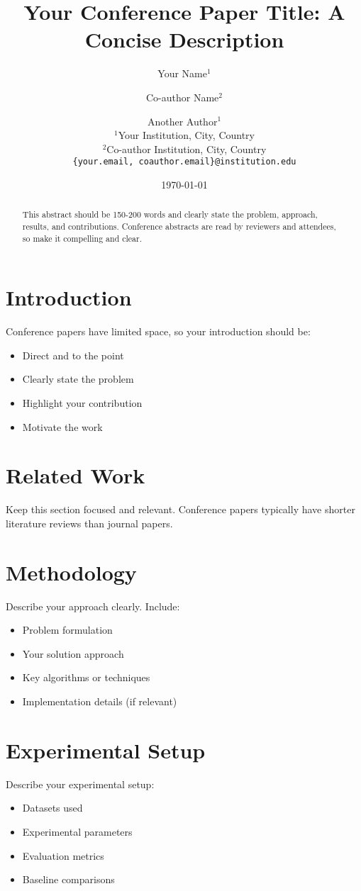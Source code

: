 \documentclass[10pt,twocolumn]{article}
\title{Your Conference Paper Title: A Concise Description}
\author{
    Your Name$^1$ \and 
    Co-author Name$^2$ \and 
    Another Author$^1$ \\
    $^1$Your Institution, City, Country \\
    $^2$Co-author Institution, City, Country \\
    \texttt{\{your.email, coauthor.email\}@institution.edu}
}
\date{\today}
\begin{document}
\maketitle

\begin{abstract}
This abstract should be 150-200 words and clearly state the problem, approach, results, and contributions. Conference abstracts are read by reviewers and attendees, so make it compelling and clear.
\end{abstract}

\section{Introduction}
Conference papers have limited space, so your introduction should be:
\begin{itemize}
    \item Direct and to the point
    \item Clearly state the problem
    \item Highlight your contribution
    \item Motivate the work
\end{itemize}

\section{Related Work}
Keep this section focused and relevant. Conference papers typically have shorter literature reviews than journal papers.

\section{Methodology}
Describe your approach clearly. Include:
\begin{itemize}
    \item Problem formulation
    \item Your solution approach
    \item Key algorithms or techniques
    \item Implementation details (if relevant)
\end{itemize}

\section{Experimental Setup}
Describe your experimental setup:
\begin{itemize}
    \item Datasets used
    \item Experimental parameters
    \item Evaluation metrics
    \item Baseline comparisons
\end{itemize}
\end{document}
